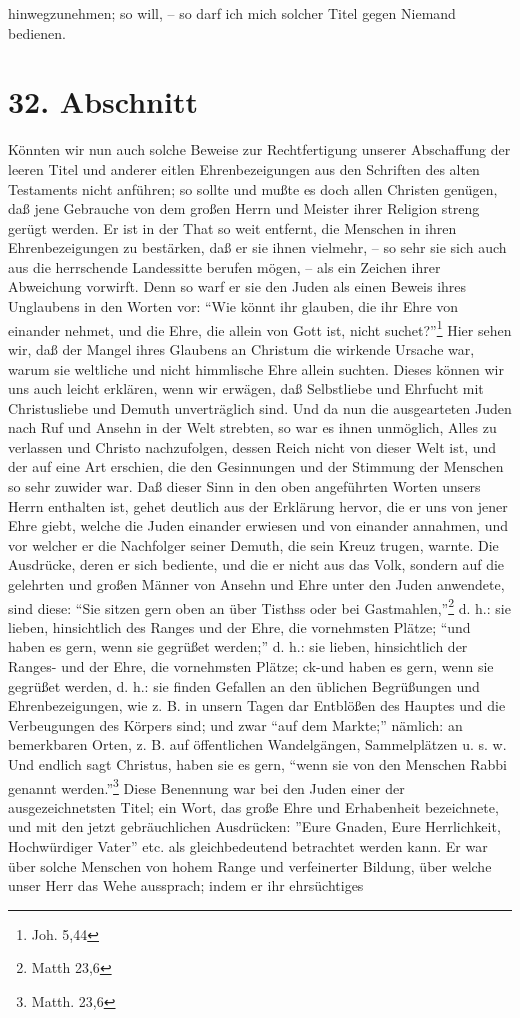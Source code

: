 hinwegzunehmen; so will, -- so darf ich mich solcher Titel gegen Niemand bedienen.

\section{32. Abschnitt}

Könnten wir nun auch solche Beweise zur Rechtfertigung unserer Abschaffung der leeren Titel und anderer eitlen Ehrenbezeigungen aus den Schriften des alten Testaments nicht anführen; so sollte und mußte es doch allen Christen genügen, daß jene Gebrauche von dem großen Herrn und Meister ihrer Religion streng gerügt werden. Er ist in der That so weit entfernt, die Menschen in ihren Ehrenbezeigungen zu bestärken, daß er sie ihnen vielmehr, -- so sehr sie sich auch aus die herrschende Landessitte berufen mögen, -- als ein Zeichen ihrer Abweichung vorwirft. Denn so warf er sie den Juden als einen Beweis ihres Unglaubens in den Worten vor: "`Wie könnt ihr glauben, die ihr Ehre von einander nehmet, und die Ehre, die allein von Gott ist, nicht suchet?"'\footnote{Joh. 5,44} Hier sehen wir, daß der Mangel ihres Glaubens an Christum die wirkende Ursache war, warum sie weltliche und nicht himmlische Ehre allein suchten. Dieses können wir uns auch leicht erklären, wenn wir erwägen, daß Selbstliebe und Ehrfucht mit Christusliebe und Demuth unverträglich sind. Und da nun die ausgearteten Juden nach Ruf und Ansehn in der Welt strebten, so war es ihnen unmöglich, Alles zu verlassen und Christo nachzufolgen, dessen Reich nicht von dieser Welt ist, und der auf eine Art erschien, die den Gesinnungen und der Stimmung der Menschen so sehr zuwider war. Daß dieser Sinn in den oben angeführten Worten unsers Herrn enthalten ist, gehet deutlich aus der Erklärung hervor, die er uns von jener Ehre giebt, welche die Juden einander erwiesen und von einander annahmen, und vor welcher er die Nachfolger seiner Demuth, die sein Kreuz trugen, warnte. Die Ausdrücke, deren er sich bediente, und die er nicht aus das Volk, sondern auf die gelehrten und großen Männer von Ansehn und Ehre unter den Juden anwendete, sind diese: "`Sie sitzen gern oben an über Tisthss oder bei Gastmahlen,"'\footnote{Matth 23,6} d. h.: sie lieben, hinsichtlich des Ranges und der Ehre, die vornehmsten Plätze; "`und haben es gern, wenn sie gegrüßet werden;"' d. h.: sie lieben, hinsichtlich der Ranges- und der Ehre, die vornehmsten Plätze; ck-und haben es gern, wenn sie gegrüßet werden, d. h.: sie finden Gefallen an den üblichen Begrüßungen und Ehrenbezeigungen, wie z. B. in unsern Tagen dar Entblößen des Hauptes und die Verbeugungen des Körpers sind; und zwar "`auf dem Markte;"' nämlich: an bemerkbaren Orten, z. B. auf öffentlichen Wandelgängen, Sammelplätzen u. s. w. Und endlich sagt Christus, haben sie es gern, "`wenn sie von den Menschen Rabbi genannt werden."'\footnote{Matth. 23,6} Diese Benennung war bei den Juden einer der ausgezeichnetsten Titel; ein Wort, das große Ehre und Erhabenheit bezeichnete, und mit den jetzt gebräuchlichen Ausdrücken: ''Eure Gnaden, Eure Herrlichkeit, Hochwürdiger Vater'' etc. als gleichbedeutend betrachtet werden kann. Er war über solche Menschen von hohem Range und verfeinerter Bildung, über welche unser Herr das Wehe aussprach; indem er ihr ehrsüchtiges 